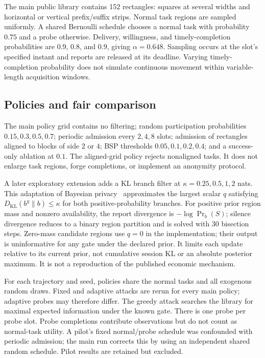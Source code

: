 \documentclass[review,12pt]{elsarticle}
\begin{document}
The main public library contains 152 rectangles: squares at several widths and horizontal or vertical prefix/suffix strips. Normal task regions are sampled uniformly. A shared Bernoulli schedule chooses a normal task with probability $0.75$ and a probe otherwise. Delivery, willingness, and timely-completion probabilities are $0.9$, $0.8$, and $0.9$, giving $\alpha=0.648$. Sampling occurs at the slot's specified instant and reports are released at its deadline. Varying timely-completion probability does not simulate continuous movement within variable-length acquisition windows.

\subsection{Policies and fair comparison}
The main policy grid contains no filtering; random participation probabilities $0.15,0.3,0.5,0.7$; periodic admission every $2,4,8$ slots; admission of rectangles aligned to blocks of side $2$ or $4$; BSP thresholds $0.05,0.1,0.2,0.4$; and a success-only ablation at $0.1$. The aligned-grid policy rejects nonaligned tasks. It does not enlarge task regions, forge completions, or implement an anonymity protocol.

A later exploratory extension adds a KL branch filter at $\kappa=0.25,0.5,1,2$ nats. This adaptation of Bayesian privacy~\cite{bayesian} approximates the largest scalar $q$ satisfying $D_{\mathrm{KL}}(b^y\|b)\le\kappa$ for both positive-probability branches. For positive prior region mass and nonzero availability, the report divergence is $-\log\Pr_b(S)$; silence divergence reduces to a binary region partition and is solved with 30 bisection steps. Zero-mass candidate regions use $q=0$ in the implementation; their output is uninformative for any gate under the declared prior. It limits each update relative to its current prior, not cumulative session KL or an absolute posterior maximum. It is not a reproduction of the published economic mechanism.

For each trajectory and seed, policies share the normal tasks and all exogenous random draws. Fixed and adaptive attacks are rerun for every main policy; adaptive probes may therefore differ. The greedy attack searches the library for maximal expected information under the known gate. There is one probe per probe slot. Probe completions contribute observations but do not count as normal-task utility. A pilot's fixed normal/probe schedule was confounded with periodic admission; the main run corrects this by using an independent shared random schedule. Pilot results are retained but excluded.
\end{document}
